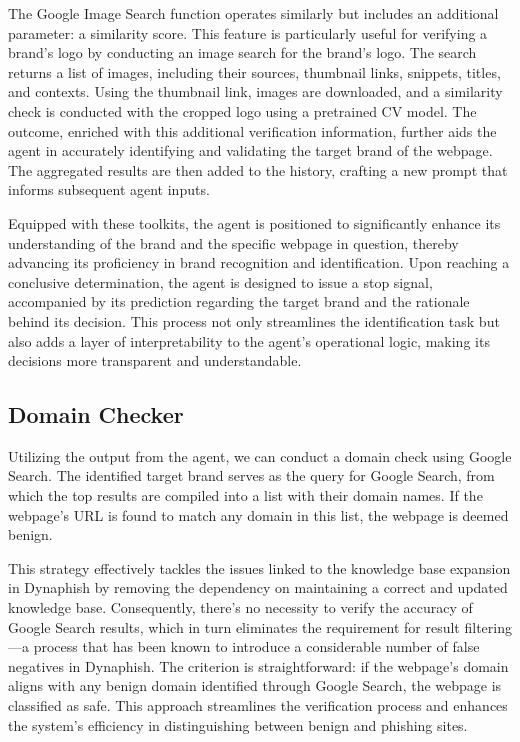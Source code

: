 The Google Image Search function operates similarly but includes an additional parameter: a similarity score. This feature is particularly useful for verifying a brand's logo by conducting an image search for the brand's logo. The search returns a list of images, including their sources, thumbnail links, snippets, titles, and contexts. Using the thumbnail link, images are downloaded, and a similarity check is conducted with the cropped logo using a pretrained CV model. The outcome, enriched with this additional verification information, further aids the agent in accurately identifying and validating the target brand of the webpage. The aggregated results are then added to the history, crafting a new prompt that informs subsequent agent inputs.

Equipped with these toolkits, the agent is positioned to significantly enhance its understanding of the brand and the specific webpage in question, thereby advancing its proficiency in brand recognition and identification. Upon reaching a conclusive determination, the agent is designed to issue a stop signal, accompanied by its prediction regarding the target brand and the rationale behind its decision. This process not only streamlines the identification task but also adds a layer of interpretability to the agent's operational logic, making its decisions more transparent and understandable.

\subsection{Domain Checker}

Utilizing the output from the agent, we can conduct a domain check using Google Search. The identified target brand serves as the query for Google Search, from which the top results are compiled into a list with their domain names. If the webpage's URL is found to match any domain in this list, the webpage is deemed benign.


This strategy effectively tackles the issues linked to the knowledge base expansion in Dynaphish by removing the dependency on maintaining a correct and updated knowledge base. Consequently, there's no necessity to verify the accuracy of Google Search results, which in turn eliminates the requirement for result filtering—a process that has been known to introduce a considerable number of false negatives in Dynaphish. The criterion is straightforward: if the webpage's domain aligns with any benign domain identified through Google Search, the webpage is classified as safe. This approach streamlines the verification process and enhances the system's efficiency in distinguishing between benign and phishing sites.

